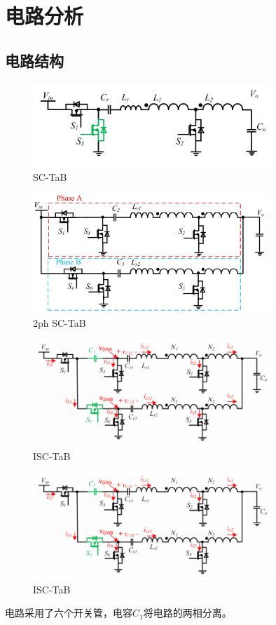 \chapter{电路分析}
\section{电路结构}
\begin{figure}[h]
    \centering
    \includegraphics[width = 0.8\textwidth]{figures/SC-TaB.png}
    \caption{SC-TaB}
\end{figure}
\begin{figure}[h]
    \centering
    \includegraphics[width = 0.8\textwidth]{figures/2ph SC-TaB.png}
    \caption{2ph SC-TaB}
\end{figure}
\begin{figure}[h]
    \centering
    \includegraphics[width = 0.8\textwidth]{figures/circuit diagram1.png}
    \caption{ISC-TaB}
\end{figure}
\begin{figure}[h]
    \centering
    \includegraphics[width = 0.8\textwidth]{figures/circuit diagram1.png}
    \caption{ISC-TaB}
\end{figure}
电路采用了六个开关管，电容$C_1$将电路的两相分离。
